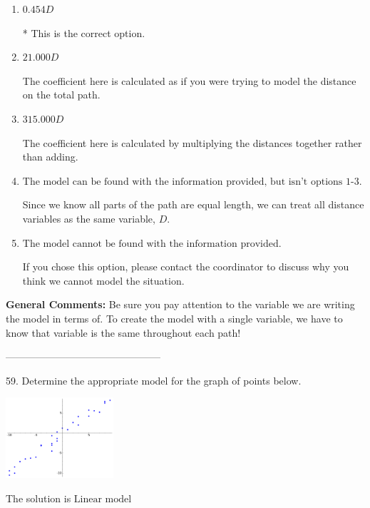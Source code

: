 \documentclass{extbook}[14pt]
\begin{document}
\begin{enumerate}[label=\Alph*.] 
\item $ 0.454 D $ 

 * This is the correct option. 
\item $ 21.000 D $ 

 The coefficient here is calculated as if you were trying to model the distance on the total path. 
\item $ 315.000 D $ 

 The coefficient here is calculated by multiplying the distances together rather than adding. 
\item $ \text{The model can be found with the information provided, but isn't options 1-3.} $ 

 Since we know all parts of the path are equal length, we can treat all distance variables as the same variable, $D$. 
\item $ \text{The model cannot be found with the information provided.} $ 

 If you chose this option, please contact the coordinator to discuss why you think we cannot model the situation. 
\end{enumerate} 
 
\textbf{General Comments:} Be sure you pay attention to the variable we are writing the model in terms of. To create the model with a single variable, we have to know that variable is the same throughout each path!

-----------------------------------------------

59. Determine the appropriate model for the graph of points below.
\begin{center} \includegraphics[width=0.3\textwidth]{../Figures/identifyModelGraph12A.png} \end{center} 

The solution is $ \text{Linear model} $ 
\end{document}
